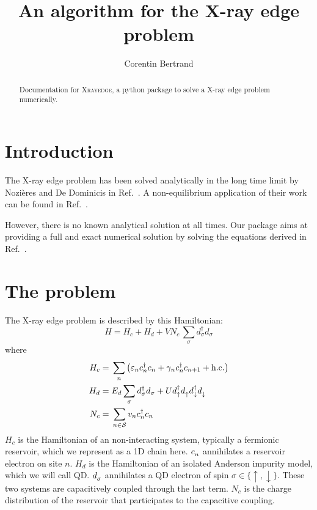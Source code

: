 \documentclass[12pt]{article}
\newcommand\up{\uparrow}
\newcommand\dn{\downarrow}
\newcommand\nodag{{\vphantom{\dagger}}}
\begin{document}
\title{An algorithm for the X-ray edge problem}
\author{Corentin Bertrand}

\maketitle

\begin{abstract}
    Documentation for \textsc{Xrayedge}, a python package to solve a X-ray edge problem numerically.
\end{abstract}

\tableofcontents


\begin{acronym}
\end{acronym}

\section{Introduction}

The X-ray edge problem has been solved analytically in the long time limit by Nozières and De Dominicis in Ref.~\cite{NozieresDeDominicis1969}.
A non-equilibrium application of their work can be found in Ref.~\cite{Aleiner1997}.

However, there is no known analytical solution at all times.
Our package aims at providing a full and exact numerical solution by solving the equations derived in Ref.~\cite{NozieresDeDominicis1969}.

\section{The problem}

The X-ray edge problem is described by this Hamiltonian:
\begin{equation}
	H = H_c + H_d + V N_c \, \sum_{\sigma} d_\sigma^\dagger d_\sigma
\end{equation}
where
\begin{align}
	H_c ={}& \sum_n \qty( \varepsilon_n c_n^\dagger c_n + \gamma_n c_n^\dagger c_{n+1} + \text{h.c.})
	\\
	H_d ={}& E_d \sum_{\sigma} d_\sigma^\dagger d_\sigma + U d_\up^\dag d_\up^\nodag d_\dn^\dag d_\dn^\nodag
	\\
	N_c ={}& \sum_{n \in \mathcal{S}} v_n c_n^\dag c_n
\end{align}
$H_c$ is the Hamiltonian of an non-interacting system, typically a fermionic reservoir, which we represent as a 1D chain here. $c_n^\nodag$ annihilates a reservoir electron on site $n$.
$H_d$ is the Hamiltonian of an isolated Anderson impurity model, which we will call \ac{QD}.
$d_\sigma^\nodag$ annihilates a \ac{QD} electron of spin $\sigma \in \{\up, \dn\}$.
These two systems are capacitively coupled through the last term. $N_c$ is the charge distribution of the reservoir that participates to the capacitive coupling.
\end{document}
